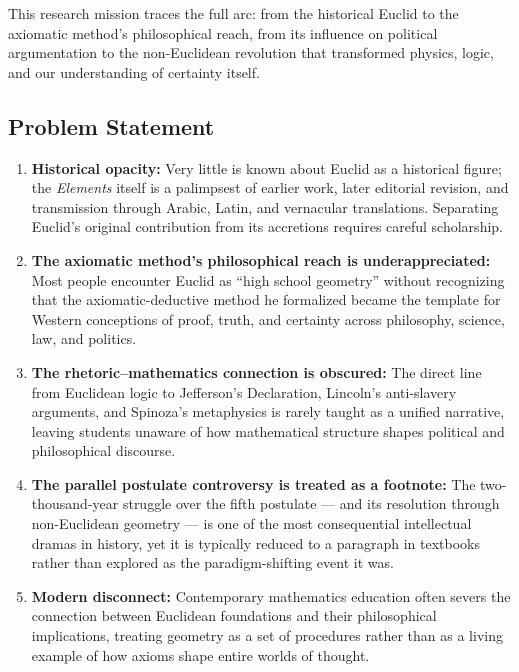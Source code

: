 \documentclass[11pt,letterpaper]{article}
\begin{document}
This research mission traces the full arc: from the historical Euclid to the axiomatic method's philosophical reach, from its influence on political argumentation to the non-Euclidean revolution that transformed physics, logic, and our understanding of certainty itself.

\subsection{Problem Statement}

\begin{enumerate}
  \item \textbf{Historical opacity:} Very little is known about Euclid as a historical figure; the \textit{Elements} itself is a palimpsest of earlier work, later editorial revision, and transmission through Arabic, Latin, and vernacular translations. Separating Euclid's original contribution from its accretions requires careful scholarship.

  \item \textbf{The axiomatic method's philosophical reach is underappreciated:} Most people encounter Euclid as ``high school geometry'' without recognizing that the axiomatic-deductive method he formalized became the template for Western conceptions of proof, truth, and certainty across philosophy, science, law, and politics.

  \item \textbf{The rhetoric--mathematics connection is obscured:} The direct line from Euclidean logic to Jefferson's Declaration, Lincoln's anti-slavery arguments, and Spinoza's metaphysics is rarely taught as a unified narrative, leaving students unaware of how mathematical structure shapes political and philosophical discourse.

  \item \textbf{The parallel postulate controversy is treated as a footnote:} The two-thousand-year struggle over the fifth postulate --- and its resolution through non-Euclidean geometry --- is one of the most consequential intellectual dramas in history, yet it is typically reduced to a paragraph in textbooks rather than explored as the paradigm-shifting event it was.

  \item \textbf{Modern disconnect:} Contemporary mathematics education often severs the connection between Euclidean foundations and their philosophical implications, treating geometry as a set of procedures rather than as a living example of how axioms shape entire worlds of thought.
\end{enumerate}
\end{document}
